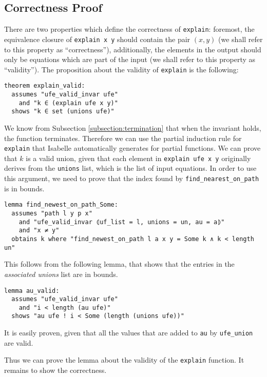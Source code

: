 \subsection{Correctness Proof}

There are two properties which define the correctness of \lstinline|explain|: foremost, the equivalence closure of \lstinline{explain x y} should contain the pair $(x, y)$ (we shall refer to this property as ``correctness''), additionally, the elements in the output should only be equations which are part of the input (we shall refer to this property as ``validity''). The proposition about the validity of \lstinline{explain} is the following:

\begin{lstlisting}
theorem explain_valid:
  assumes "ufe_valid_invar ufe"
    and "k ∈ (explain ufe x y)"
  shows "k ∈ set (unions ufe)"
\end{lstlisting}

We know from Subsection \ref{subsection:termination} that when the invariant holds, the function terminates. Therefore we can use the partial induction rule for \lstinline|explain| that Isabelle automatically generates for partial functions. We can prove that $k$ is a valid union, given that each element in \lstinline|explain ufe x y| originally derives from the \lstinline{unions} list, which is the list of input equations. In order to use this argument, we need to prove that the index found by \lstinline{find_nearest_on_path} is in bounds.

\begin{lstlisting}
lemma find_newest_on_path_Some:
  assumes "path l y p x"
    and "ufe_valid_invar ⦇uf_list = l, unions = un, au = a⦈"
    and "x ≠ y"
  obtains k where "find_newest_on_path l a x y = Some k ∧ k < length un"
\end{lstlisting}

This follows from the following lemma, that shows that the entries in the \emph{associated unions} list are in bounds.

\begin{lstlisting}
lemma au_valid:
  assumes "ufe_valid_invar ufe"
    and "i < length (au ufe)"
  shows "au ufe ! i < Some (length (unions ufe))"
\end{lstlisting}

It is easily proven, given that all the values that are added to \lstinline|au| by \lstinline|ufe_union| are valid.

Thus we can prove the lemma about the validity of the \lstinline|explain| function.
It remains to show the correctness.

